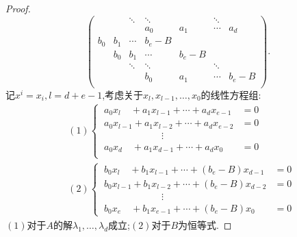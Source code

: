 \documentclass{article}
\begin{document}
\begin{enumerate}
\begin{proof}
\[\begin{pmatrix}
                &     & \ddots & \ddots &       & \ddots &     \\
                &     &        &    a_0 & a_1   & \cdots & a_d \\
            b_0 & b_1 & \cdots &  b_e-B &       &        &     \\
                & b_0 &    b_1 & \cdots & b_e-B &        &     \\
                &     & \ddots & \ddots &       & \ddots &     \\
                &     &        &    b_0 & a_1   & \cdots & b_e-B \\
        \end{pmatrix}.
    \]
    记$x^i=x_i,l=d+e-1$,考虑关于$x_{l},x_{l-1},\ldots,x_0$的线性方程组:
    \begin{align*}
        &(1)\begin{cases}
            \ a_0 x_l \quad +a_1 x_{l-1} +\cdots +a_d x_{e-1}&=0\\
            \ a_0 x_{l-1} +a_1 x_{l-2} +\cdots +a_d x_{e-2}&=0\\
            \ \qquad \qquad \qquad \vdots &\\
            \ a_0 x_d \quad +a_1 x_{d-1} +\cdots +a_d x_0&=0\\
        \end{cases}
        \\
        &(2)\begin{cases}
            \ b_0 x_l \quad +b_1 x_{l-1} +\cdots +(b_e-B)x_{d-1}&=0\\
            \ b_0 x_{l-1} +b_1 x_{l-2} +\cdots +(b_e-B)x_{d-2}&=0\\
            \ \qquad \qquad \qquad \vdots &\\
            \ b_0 x_e \quad +b_1 x_{e-1} +\cdots +(b_e-B)x_0&=0
        \end{cases}
    \end{align*}
    $(1)$对于$A$的解$\lambda_1,\ldots,\lambda_d$成立;$(2)$对于$B$为恒等式.


\end{proof}
\end{enumerate}
\end{document}
